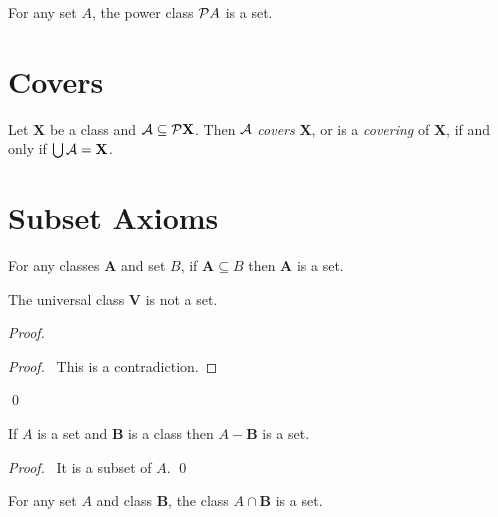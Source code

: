 \begin{axiom}
    For any set $A$, the power class $\pow A$ is a set.
\end{axiom}

\section{Covers}

\begin{definition}[Cover]
    Let $\mathbf{X}$ be a class and $\mathbf{\AA} \subseteq \pow \mathbf{X}$. 
    Then $\mathbf{\AA}$ \emph{covers} $\mathbf{X}$,
    or is a \emph{covering} of $\mathbf{X}$, if and only if
    $\bigcup \mathbf{\AA} = \mathbf{X}$.
\end{definition}

\section{Subset Axioms}

\begin{axioms}
    For any classes $\mathbf{A}$ and set $B$,
    if $\mathbf{A} \subseteq B$
    then $\mathbf{A}$ is a set.
\end{axioms}

\begin{theorem}
    The universal class $\mathbf{V}$ is not a set.
\end{theorem}

\begin{proof}
    \pf
    \qedstep
    \begin{proof}
        \pf\ This is a contradiction.
    \end{proof}
    \qed
\end{proof}

\begin{theorem}
    If $A$ is a set and $\mathbf{B}$ is a class then $A - \mathbf{B}$ is a set.
\end{theorem}

\begin{proof}
    \pf\ It is a subset of $A$. \qed
\end{proof}

\begin{theorem}
    For any set $A$ and class $\mathbf{B}$, the class $A \cap \mathbf{B}$ is a set.
\end{theorem}

